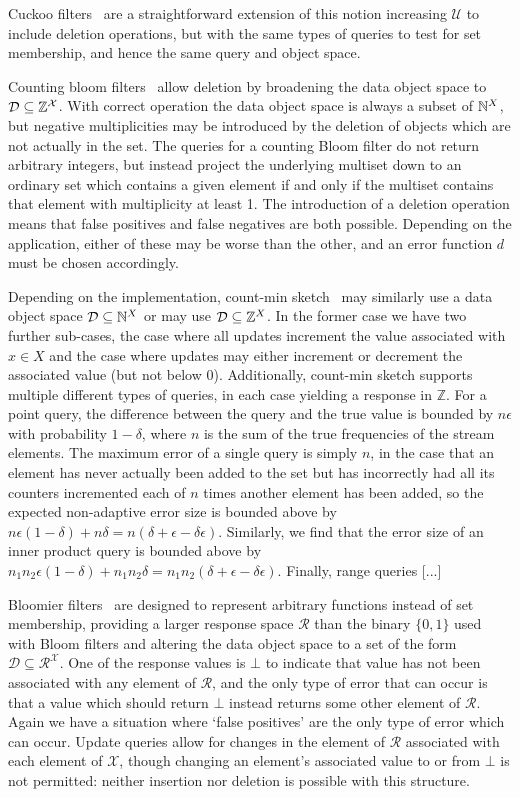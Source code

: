 Cuckoo filters~\cite{xxx} are a straightforward extension of this notion increasing $\mathcal{U}$ to include deletion operations, but with the same types of queries to test for set membership, and hence the same query and object space.

Counting bloom filters~\cite{xxx} allow deletion by broadening the data object space to $\mathcal{D} \subseteq \mathbb{Z}^\mathcal{X}$. With correct operation the data object space is always a subset of $\mathbb{N}^X$, but negative multiplicities may be introduced by the deletion of objects which are not actually in the set. The queries for a counting Bloom filter do not return arbitrary integers, but instead project the underlying multiset down to an ordinary set which contains a given element if and only if the multiset contains that element with multiplicity at least 1. The introduction of a deletion operation means that false positives and false negatives are both possible. Depending on the application, either of these may be worse than the other, and an error function $d$ must be chosen accordingly.

Depending on the implementation, count-min sketch~\cite{xxx} may similarly use a data object space $\mathcal{D} \subseteq \mathbb{N}^X$ or may use $\mathcal{D} \subseteq \mathbb{Z}^X$. In the former case we have two further sub-cases, the case where all updates increment the value associated with $x \in X$ and the case where updates may either increment or decrement the associated value (but not below 0). Additionally, count-min sketch supports multiple different types of queries, in each case yielding a response in $\mathbb{Z}$. For a point query, the difference between the query and the true value is bounded by $n\epsilon$ with probability $1-\delta$, where $n$ is the sum of the true frequencies of the stream elements. The maximum error of a single query is simply $n$, in the case that an element has never actually been added to the set but has incorrectly had all its counters incremented each of $n$ times another element has been added, so the expected non-adaptive error size is bounded above by $n\epsilon(1-\delta)+n\delta = n(\delta+\epsilon-\delta\epsilon)$.  Similarly, we find that the error size of an inner product query is bounded above by $n_1n_2\epsilon(1-\delta)+n_1n_2\delta = n_1n_2(\delta+\epsilon-\delta\epsilon)$. Finally, range queries [...]

Bloomier filters~\cite{xxx} are designed to represent arbitrary functions instead of set membership, providing a larger response space $\mathcal{R}$ than the binary $\{0,1\}$ used with Bloom filters and altering the data object space to a set of the form $\mathcal{D} \subseteq \mathcal{R}^\mathcal{X}$. One of the response values is $\bot$ to indicate that value has not been associated with any element of $\mathcal{R}$, and the only type of error that can occur is that a value which should return $\bot$ instead returns some other element of $\mathcal{R}$. Again we have a situation where `false positives' are the only type of error which can occur. Update queries allow for changes in the element of $\mathcal{R}$ associated with each element of $\mathcal{X}$, though changing an element's associated value to or from $\bot$ is not permitted: neither insertion nor deletion is possible with this structure.

